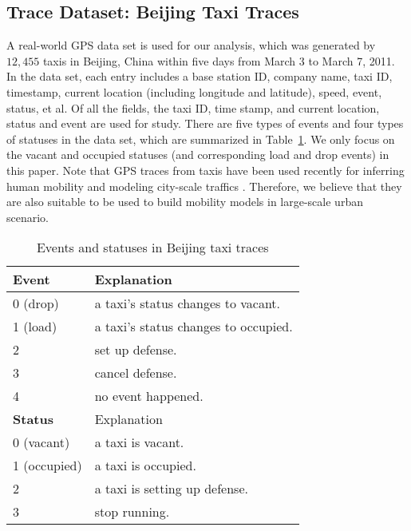 \subsection{Trace Dataset: Beijing Taxi Traces}
\label{section_trace_data}

A real-world GPS data set is used for our analysis, which was generated by $12,455$ taxis in Beijing, China within five days from March 3 to March 7, 2011. In the data set, each entry includes a base station ID, company name, taxi ID, timestamp, current location (including longitude and latitude), speed, event, status, et al. Of all the fields, the taxi ID, time stamp, and current location, status and event are used for study. There are five types of events and four types of statuses in the data set, which are summarized in Table~\ref{table_event_detail}. We only focus on the vacant and occupied statuses (and corresponding
load and drop events) in this paper. Note that GPS traces from taxis have been used recently for inferring human mobility \cite{Ganti} and modeling city-scale traffics \cite{Aslam}. Therefore, we believe that they are also suitable to be used to build mobility models in large-scale urban scenario.

\begin{table}[!h]
\caption{Events and statuses in Beijing taxi traces}\label{table_event_detail}
\centering
\begin{tabular}{l|l}
  \hline
  {\bf Event} & Explanation \\
  \hline
  0 (drop) & a taxi's status changes to vacant.\\
  \hline
  1 (load) & a taxi's status changes to occupied.\\
  \hline
  2 & set up defense.\\
  \hline
  3 & cancel defense.\\
  \hline
  4 & no event happened.\\
  \hline
  \hline
  {\bf Status} & Explanation \\
  \hline
0 (vacant) & a taxi is vacant. \\
    \hline
1 (occupied) & a taxi is occupied. \\
    \hline
2 & a taxi is setting up defense. \\
    \hline
3 & stop running.\\
  \hline
\end{tabular}
\end{table}






